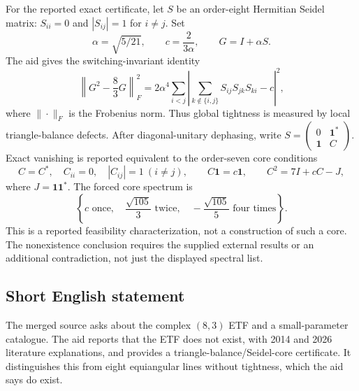 \documentclass[11pt]{article}
\begin{document}
For the reported exact certificate, let \(S\) be an order-eight Hermitian Seidel matrix: \(S_{ii}=0\) and \(|S_{ij}|=1\) for \(i\ne j\). Set
\[
 \alpha=\sqrt{5/21},\qquad c=\frac2{3\alpha},\qquad G=I+\alpha S.
\]
The aid gives the switching-invariant identity
\[
 \left\|G^2-\frac83G\right\|_F^2
 =2\alpha^4\sum_{i<j}
 \left|\sum_{k\notin\{i,j\}}S_{ij}S_{jk}S_{ki}-c\right|^2,
\]
where \(\|\cdot\|_F\) is the Frobenius norm. Thus global tightness is measured by local triangle-balance defects. After diagonal-unitary dephasing, write
\(S=\left(\begin{smallmatrix}0&\mathbf1^*\\\mathbf1&C\end{smallmatrix}\right)\).
Exact vanishing is reported equivalent to the order-seven core conditions
\[
 C=C^*,\quad C_{ii}=0,\quad |C_{ij}|=1\ (i\ne j),\qquad
 C\mathbf1=c\mathbf1,\qquad C^2=7I+cC-J,
\]
where \(J=\mathbf1\mathbf1^*\). The forced core spectrum is
\[
 \left\{c\text{ once},\quad\frac{\sqrt{105}}3\text{ twice},
                   \quad-\frac{\sqrt{105}}5\text{ four times}\right\}.
\]
This is a reported feasibility characterization, not a construction of such a core. The nonexistence conclusion requires the supplied external results or an additional contradiction, not just the displayed spectral list.
\subsection{Short English statement}
The merged source asks about the complex \((8,3)\) ETF and a small-parameter catalogue. The aid reports that the ETF does not exist, with 2014 and 2026 literature explanations, and provides a triangle-balance/Seidel-core certificate. It distinguishes this from eight equiangular lines without tightness, which the aid says do exist.
\end{document}
